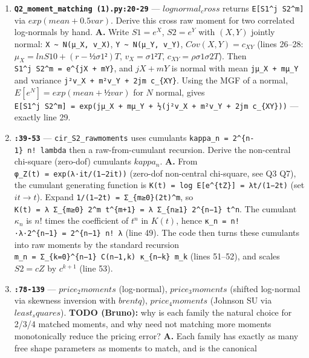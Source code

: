 \documentclass[
  11pt,
]{article}
\begin{document}
\begin{enumerate}
\def\labelenumi{\arabic{enumi}.}
\setcounter{enumi}{11}
\item
  \textbf{\texttt{Q2\_moment\_matching\ (1).py:20-29}} ---
  \(lognormal_cross\) returns \texttt{E{[}S1\^{}j\ S2\^{}m{]}} via
  \(exp(mean + 0.5 var)\). Derive this cross raw moment for two
  correlated log-normals by hand. \textbf{A.} Write \(S1 = e^X\),
  \(S2 = e^Y\) with \((X,Y)\) jointly normal:
  \texttt{X\ \textasciitilde{}\ N(μ\_X,\ v\_X)},
  \texttt{Y\ \textasciitilde{}\ N(μ\_Y,\ v\_Y)}, \(Cov(X,Y) = c_{XY}\)
  (lines 26--28: \(μ_X = ln S10 + (r−½σ1²)T\), \(v_X = σ1²T\),
  \(c_{XY} = ρσ1σ2T\)). Then
  \texttt{S1\^{}j\ S2\^{}m\ =\ e\^{}\{jX\ +\ mY\}}, and \(jX + mY\) is
  normal with mean \texttt{jμ\_X\ +\ mμ\_Y} and variance
  \texttt{j²v\_X\ +\ m²v\_Y\ +\ 2jm\ c\_\{XY\}}. Using the MGF of a
  normal, \(E[e^N] = exp(mean + ½var)\) for \(N\) normal, gives
  \texttt{E{[}S1\^{}j\ S2\^{}m{]}\ =\ exp(jμ\_X\ +\ mμ\_Y\ +\ ½(j²v\_X\ +\ m²v\_Y\ +\ 2jm\ c\_\{XY\}))}
  --- exactly line 29.
\item
  \textbf{\texttt{:39-53}} --- \texttt{cir\_S2\_rawmoments} uses
  cumulants \texttt{kappa\_n\ =\ 2\^{}\{n-1\}\ n!\ lambda} then a
  raw-from-cumulant recursion. Derive the non-central chi-square
  (zero-dof) cumulants \(kappa_n\). \textbf{A.} From
  \texttt{φ\_Z(t)\ =\ exp(λ·it/(1−2it))} (zero-dof non-central
  chi-square, see Q3 Q7), the cumulant generating function is
  \texttt{K(t)\ =\ log\ E{[}e\^{}\{tZ\}{]}\ =\ λt/(1−2t)} (set
  \(it → t\)). Expand \texttt{1/(1−2t)\ =\ Σ\_\{m≥0\}(2t)\^{}m}, so
  \texttt{K(t)\ =\ λ\ Σ\_\{m≥0\}\ 2\^{}m\ t\^{}\{m+1\}\ =\ λ\ Σ\_\{n≥1\}\ 2\^{}\{n−1\}\ t\^{}n}.
  The cumulant \(κ_n\) is \(n!\) times the coefficient of \(t^n\) in
  \(K(t)\), hence
  \texttt{κ\_n\ =\ n!·λ·2\^{}\{n−1\}\ =\ 2\^{}\{n−1\}\ n!\ λ} (line 49).
  The code then turns these cumulants into raw moments by the standard
  recursion
  \texttt{m\_n\ =\ Σ\_\{k=0\}\^{}\{n−1\}\ C(n−1,k)\ κ\_\{n−k\}\ m\_k}
  (lines 51--52), and scales \(S2 = cZ\) by \(c^{k+1}\) (line 53).
\item
  \textbf{\texttt{:78-139}} --- \(price_2moments\) (log-normal),
  \(price_3moments\) (shifted log-normal via skewness inversion with
  \(brentq\)), \(price_4moments\) (Johnson SU via \(least_squares\)).
  \textbf{TODO (Bruno):} why is each family the natural choice for 2/3/4
  matched moments, and why need not matching more moments monotonically
  reduce the pricing error? \textbf{A.} Each family has exactly as many
  free shape parameters as moments to match, and is the canonical

\end{enumerate}
\end{document}
